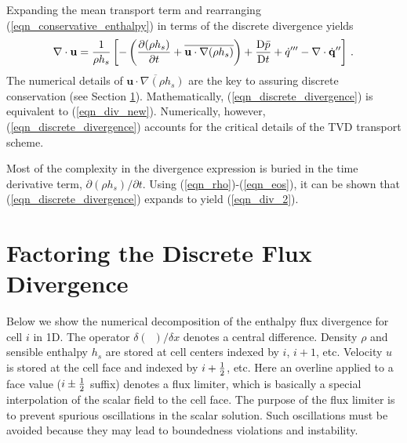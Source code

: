 Expanding the mean transport term and rearranging (\ref{eqn_conservative_enthalpy}) in terms of the discrete divergence yields
\begin{equation}
\label{eqn_discrete_divergence}
\nabla\cdot \mathbf{u} = \frac{1}{\rho h_s}\left[ -\left( \frac{\partial (\rho h_s)}{\partial t} + \overline{\mathbf{u}\cdot\nabla(\rho
h_s)} \right) + \frac{\mbox{D} \bar{p}}{\mbox{D} t} + \dot{q}^{\prime\prime\prime} - \nabla\cdot \dot{\mathbf{q}}^{\prime\prime} \right] \,\mbox{.}
\end{equation}
The numerical details of $\overline{\mathbf{u}\cdot\nabla(\rho h_s)}$ are the key to assuring discrete conservation (see Section
\ref{app_transport_decomposition}). Mathematically, (\ref{eqn_discrete_divergence}) is  equivalent to (\ref{eqn_div_new}).
Numerically, however, (\ref{eqn_discrete_divergence}) accounts for the critical details of the TVD transport scheme.

Most of the complexity in the divergence expression is buried in the time derivative term, $\partial (\rho h_s)/\partial t$. 
Using (\ref{eqn_rho})-(\ref{eqn_eos}), it can be shown that (\ref{eqn_discrete_divergence}) expands to yield (\ref{eqn_div_2}).



\section{Factoring the Discrete Flux Divergence}
\label{app_transport_decomposition}

Below we show the numerical decomposition of the enthalpy flux divergence for cell $i$ in 1D.  The operator $\delta(\,\,\,)/\delta
x$ denotes a central difference.  Density $\rho$ and sensible enthalpy $h_s$ are stored at cell centers indexed by $i$, $i+1$,
etc.  Velocity $u$ is stored at the cell face and indexed by $i+\mbox{$\frac{1}{2}$}$, etc.  Here an overline applied to a face value
($i\pm\mbox{$\frac{1}{2}$}$ suffix) denotes a flux limiter, which is basically a special interpolation of the scalar field to the cell face. 
The purpose of the flux limiter is to prevent spurious oscillations in the scalar solution.  Such oscillations must be avoided
because they may lead to boundedness violations and instability.

